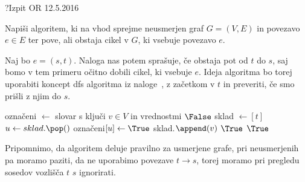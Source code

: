 \begin{naloga}{?}{Izpit OR 12.5.2016}
\begin{vprasanje}
Napiši algoritem,
ki na vhod sprejme neusmerjen graf $G = (V, E)$ in povezavo $e \in E$
ter pove, ali obstaja cikel v $G$, ki vsebuje povezavo $e$.
\end{vprasanje}

\begin{odgovor}
Naj bo $e = (s, t)$. 
Naloga nas potem sprašuje, če obstaja pot od $t$ do $s$, 
saj bomo v tem primeru očitno dobili cikel, ki vsebuje $e$.
Ideja algoritma bo torej uporabiti koncept {\sc dfs} algoritma iz naloge~\nal[Dfs], z začetkom v $t$ 
in preveriti, če smo prišli z njim do $s$.

\begin{small}
\begin{algorithmic}
	\State označeni $\gets$ slovar s ključi $v \in V$ in vrednostmi $\False$
	\State sklad $\gets [t]$
		\State $u \gets sklad.\pop()$
			\State označeni$[u] \gets \True$
					\State sklad.$\append(v)$
						\State \Return $\True$
					\EndIf
				\EndIf
			\EndFor
		\EndIf
	\EndWhile
	\State \Return $\True$
\EndFunction
\end{algorithmic}
\end{small}
Pripomnimo, da algoritem deluje pravilno za usmerjene grafe, 
pri neusmerjenih pa moramo paziti, 
da ne uporabimo povezave $t \rightarrow s$, 
torej moramo pri pregledu sosedov vozlišča $t$ $s$ ignorirati.
\end{odgovor}
\end{naloga}
